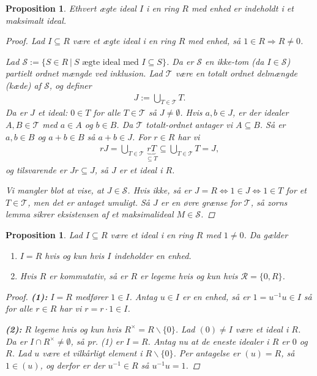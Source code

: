 \documentclass[10pt,twoside,openany,final]{memoir}
\theoremstyle{break}
\newtheorem{proposition}[section]{Proposition}
\theoremstyle{Break}
\begin{document}
\begin{proposition}
Ethvert ægte ideal $I$ i en ring $R$ med enhed er indeholdt i et maksimalt ideal.
\begin{proof}
Lad $I\subseteq R$ være et ægte ideal i en ring $R$ med enhed, så $1 \in R \Rightarrow R \neq 0$. 

\noindent Lad $\mathcal{S}:=\{ S \in R \ | \ S \text{ ægte ideal med } I \subseteq S\} $. Da er $\mathcal{S}$ en ikke-tom (da $I \in \mathcal{S}$) partielt ordnet mængde ved inklusion. Lad $\mathcal{T}$ være en totalt ordnet delmængde (kæde) af $\mathcal{S}$, og definer
\begin{align*}
J := \bigcup_{T \in \mathcal{T}} T.
\end{align*} 
Da er $J$ et ideal: $0 \in T$ for alle $T \in \mathcal{T}$ så $J \neq \emptyset $. Hvis $a,b \in J$, er der idealer $A,B \in \mathcal{T}$ med $a \in A$ og $b \in B$. Da $\mathcal{T}$ totalt-ordnet antager vi $A \subseteq B$. Så er $a,b \in B$ og $a+b \in B$ så $a+b \in J$. For $r \in R$ har vi
\begin{align*}
rJ = \bigcup_{T \in \mathcal{T}} \underbrace{rT}_{\subseteq T} \subseteq \bigcup_{T \in \mathcal{T}} T = J,
\end{align*}
og tilsvarende er $Jr \subseteq J$, så $J$ er et ideal i $R$.

Vi mangler blot at vise, at $J \in \mathcal{S}$. Hvis ikke, så er $J=R \iff 1 \in J \iff 1 \in T$ for et $T \in \mathcal{T}$, men det er antaget umuligt. Så $J$ er en øvre grænse for $\mathcal{T}$, så zorns lemma sikrer eksistensen af et maksimalideal $M \in \mathcal{S}$.   
\end{proof}
\end{proposition}

\begin{proposition}
Lad $I \subseteq R$ være et ideal i en ring $R$ med $1 \neq 0$. Da gælder
\begin{enumerate}
\item $I=R$ hvis og kun hvis $I$ indeholder en enhed.
\item Hvis $R$ er kommutativ, så er $R$ er legeme hvis og kun hvis $\mathcal{R}=\{ 0 , R\}$.
\end{enumerate}
\begin{proof}
\textbf{(1):} $I=R$ medfører $1 \in I$. Antag $u \in I$ er en enhed, så er $1=u^{-1}u \in I $ så for alle $r \in R$ har vi $r=r \cdot 1 \in I$.

\noindent \textbf{(2):} $R$ legeme hvis og kun hvis $R^{\times}=R\backslash\{0\}$. Lad $(0) \neq I$ være et ideal i $R$. Da er $I \cap R^{\times} \neq \emptyset$, så pr. (1) er $I= R$. Antag nu at de eneste idealer i $R$ er $0$ og $R$. Lad $u$ være et vilkårligt element i $R\backslash\{0\}$. Per antagelse er $(u) = R$, så $1 \in (u)$, og derfor er der $u^{-1} \in R$ så $u^{-1}u=1$.
\end{proof}
\end{proposition}
\end{document}
